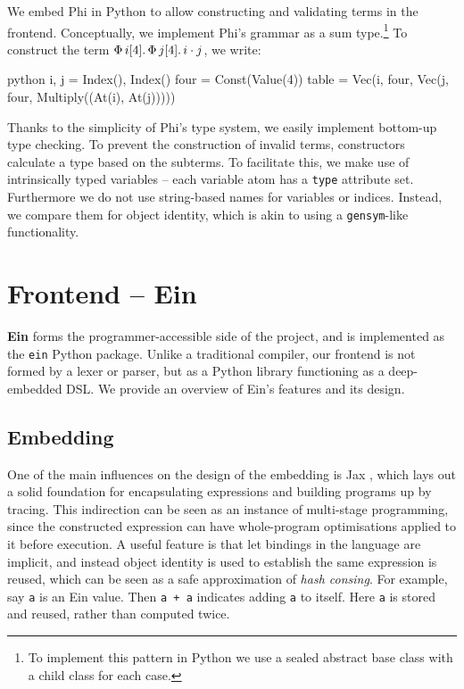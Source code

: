 We embed Phi in Python to allow constructing and validating terms in the frontend. Conceptually, we implement Phi's grammar as a sum type.\footnote{To implement this pattern in Python we use a sealed abstract base class with a child class for each case.} To construct the term $\Phi\, {i}[{4}] \ldotp {\Phi\, {j}[{4}] \ldotp {i \cdot j}}$, we write:
\begin{center}
\begin{cminted}{python}
i, j = Index(), Index()
four = Const(Value(4))
table = Vec(i, four, Vec(j, four, Multiply((At(i), At(j)))))
\end{cminted}
\end{center}
Thanks to the simplicity of Phi's type system, we easily implement bottom-up type checking. To prevent the construction of invalid terms, constructors calculate a type based on the subterms. To facilitate this, we make use of intrinsically typed variables -- each variable atom has a \texttt{type} attribute set. Furthermore we do not use string-based names for variables or indices. Instead, we compare them for object identity, which is akin to using a \texttt{gensym}-like functionality.


\section{Frontend -- Ein}
\label{ein-dsl}

\textbf{Ein} forms the programmer-accessible side of the project, and is implemented as the \texttt{ein} Python package. Unlike a traditional compiler, our frontend is not formed by a lexer or parser, but as a Python library functioning as a deep-embedded DSL. We provide an overview of Ein's features and its design. 

\subsection{Embedding}

One of the main influences on the design of the embedding is Jax \cite{frostig2018compiling}, which lays out a solid foundation for encapsulating expressions and building programs up by tracing. This indirection can be seen as an instance of multi-stage programming, since the constructed expression can have whole-program optimisations applied to it before execution. A useful feature is that let bindings in the language are implicit, and instead object identity is used to establish the same expression is reused, which can be seen as a safe approximation of \textit{hash consing}. For example, say \texttt{a} is an Ein value. Then \texttt{a + a} indicates adding \texttt{a} to itself. Here \texttt{a} is stored and reused, rather than computed twice.

